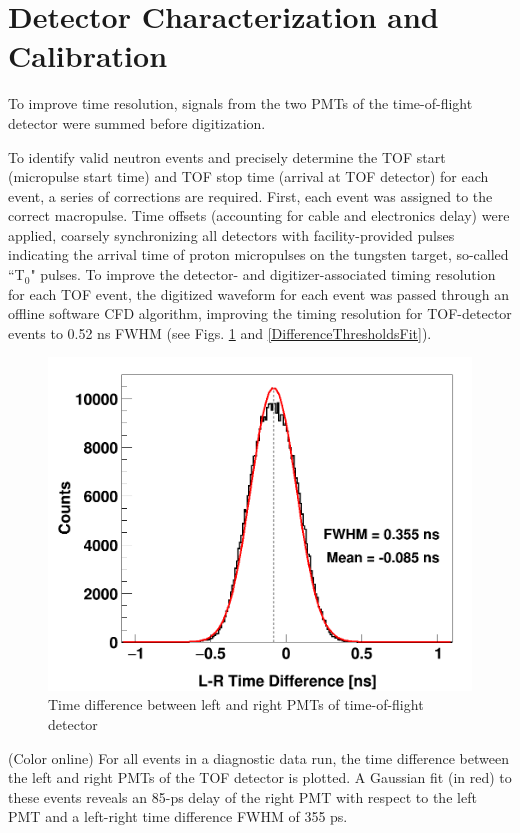 \section{Detector Characterization and Calibration}
 To improve time resolution, signals
from the two PMTs of the time-of-flight detector were summed before digitization.

To identify valid neutron events and precisely determine the TOF start (micropulse start 
time) and TOF stop time (arrival at TOF detector) for each event, a series of corrections 
are required.  First, each event was assigned to the correct macropulse.
Time offsets (accounting for cable and
electronics delay) were applied, coarsely synchronizing all detectors with
facility-provided pulses indicating the arrival time of proton micropulses on the
tungsten target, so-called ``T$_{0}$" pulses.
To improve the detector- and digitizer-associated timing resolution for each TOF
event, the digitized waveform for each event was passed 
through an offline software CFD algorithm, improving the timing resolution 
for TOF-detector events to 0.52 ns FWHM (see Figs. \ref{LRTimeDifferenceLinear}
and \ref{DifferenceThresholdsFit}).

\begin{figure}
    \includegraphics[scale=0.3]{figures/Difference_Linear.png}
    \caption{Time difference between left and right PMTs of time-of-flight detector}
    \label{LRTimeDifferenceLinear}
\end{figure}

(Color online) For all events in a diagnostic data run, the time difference   
        between the left and right PMTs of the TOF detector is plotted.
        A Gaussian fit (in red) to these events reveals an 85-ps delay of the right PMT with 
    respect to the left PMT and a left-right time difference FWHM of 355 ps.

